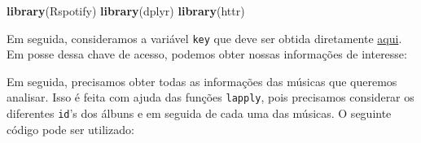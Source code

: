 \documentclass[]{book}
\newenvironment{Shaded}{\begin{snugshade}}{\end{snugshade}}
\newcommand{\CommentTok}[1]{\textcolor[rgb]{0.56,0.35,0.01}{\textit{#1}}}
\newcommand{\DataTypeTok}[1]{\textcolor[rgb]{0.13,0.29,0.53}{#1}}
\newcommand{\DecValTok}[1]{\textcolor[rgb]{0.00,0.00,0.81}{#1}}
\newcommand{\KeywordTok}[1]{\textcolor[rgb]{0.13,0.29,0.53}{\textbf{#1}}}
\newcommand{\NormalTok}[1]{#1}
\newcommand{\OperatorTok}[1]{\textcolor[rgb]{0.81,0.36,0.00}{\textbf{#1}}}
\newcommand{\StringTok}[1]{\textcolor[rgb]{0.31,0.60,0.02}{#1}}
\begin{document}
\begin{Shaded}
\begin{Highlighting}[]
\KeywordTok{library}\NormalTok{(Rspotify)}
\KeywordTok{library}\NormalTok{(dplyr)}
\KeywordTok{library}\NormalTok{(httr)}
\end{Highlighting}
\end{Shaded}

Em seguida, consideramos a variável \texttt{key} que deve ser obtida diretamente \href{https://developer.spotify.com/documentation/general/guides/authorization-guide/}{aqui}. Em posse dessa chave de acesso, podemos obter nossas informações de interesse:

\begin{Shaded}
\end{Shaded}

Em seguida, precisamos obter todas as informações das músicas que queremos analisar. Isso é feita com ajuda das funções \texttt{lapply}, pois precisamos considerar os diferentes \texttt{id}'s dos álbuns e em seguida de cada uma das músicas. O seguinte código pode ser utilizado:
\end{document}
